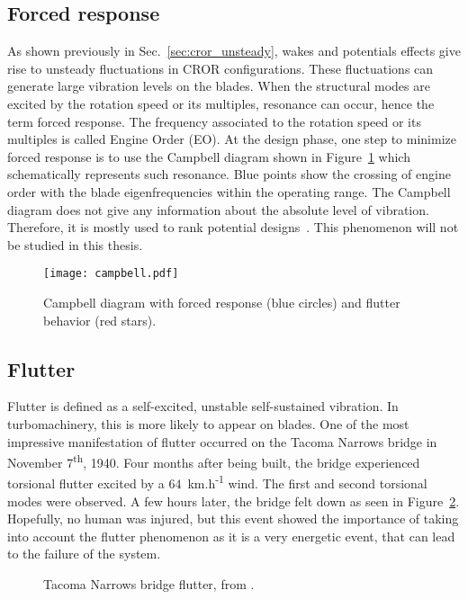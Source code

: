 
\subsection{Forced response}
\label{sub:forced_response}

As shown previously in Sec.~\ref{sec:cror_unsteady}, wakes and
potentials effects give rise to unsteady fluctuations in 
CROR configurations. These fluctuations 
can generate large vibration levels on the blades.
When the structural modes are excited by the rotation speed
or its multiples, resonance can occur,
hence the term forced response. 
The frequency associated to the rotation speed or its multiples
is called Engine Order (EO).
At the design phase, one step to minimize forced response is
to use the Campbell diagram shown in Figure~\ref{fig:campbell}
which schematically represents such resonance.
Blue points show the crossing of engine order with 
the blade eigenfrequencies within the operating range. 
The Campbell diagram does not give any information about
the absolute level of vibration. Therefore, it is mostly
used to rank potential designs~\cite{Marshall1996}. This phenomenon
will not be studied in this thesis.
\begin{figure}[htp]
  \centering
  \texttt{[image: campbell.pdf]}
  \caption{Campbell diagram with forced response (blue circles)
  and flutter behavior (red stars).}
  \label{fig:campbell}
\end{figure}


\subsection{Flutter}
\label{sub:flutter}

Flutter is defined as a self-excited, unstable 
self-sustained vibration. In turbomachinery, this is
more likely to appear on blades.
One of the most impressive
manifestation of flutter occurred on the Tacoma Narrows
bridge in November 7\textsuperscript{th}, 1940.
Four months after being built, the bridge experienced 
torsional flutter excited by a 
\mbox{$64$~km.h\textsuperscript{-1}} wind.
The first and second torsional modes were observed.
A few hours later, the bridge felt down as seen in 
Figure~\ref{fig:tacoma_bridge}. Hopefully, no human
was injured, but this event showed the importance
of taking into account the flutter phenomenon as
it is a very energetic event, that can lead to the failure of the system.
\begin{figure}[htp]
  \centering
  \caption{Tacoma Narrows bridge flutter, from \citet{Smith1974}.}
  \label{fig:tacoma_bridge}
\end{figure}

